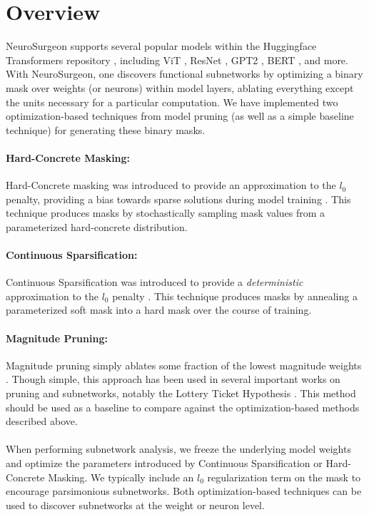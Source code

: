 \documentclass[11pt]{article}
\begin{document}
\section{Overview}
  NeuroSurgeon supports several popular models within the Huggingface Transformers repository \cite{wolf2019huggingface}, including ViT \cite{dosovitskiy2020image}, ResNet \cite{he2016deep}, GPT2 \cite{radford2019language}, BERT \cite{devlin2018bert}, and more. 
  With NeuroSurgeon, one discovers functional subnetworks by optimizing a binary mask over weights (or neurons) within model layers, ablating everything except the units necessary for a particular computation.
We have implemented two optimization-based techniques from model pruning (as well as a simple baseline technique) for generating these binary masks.

\paragraph{Hard-Concrete Masking:}
Hard-Concrete masking was introduced to provide an approximation to the $l_0$ penalty, providing a bias towards sparse solutions during model training \cite{louizos2017learning}. This technique produces masks by stochastically sampling mask values from a parameterized hard-concrete distribution. 
\paragraph{Continuous Sparsification:}
Continuous Sparsification was introduced to provide a \textit{deterministic} approximation to the $l_0$ penalty \cite{savarese2020winning}. This technique produces masks by annealing a parameterized soft mask into a hard mask over the course of training. 

\paragraph{Magnitude Pruning:}
Magnitude pruning simply ablates some fraction of the lowest magnitude weights \cite{han2015learning}. Though simple, this approach has been used in several important works on pruning and subnetworks, notably the Lottery Ticket Hypothesis \cite{frankle2018lottery}. This method should be used as a baseline to compare against the optimization-based methods described above.

\paragraph{}When performing subnetwork analysis, we freeze the underlying model weights and optimize the parameters introduced by Continuous Sparsification or Hard-Concrete Masking. We typically include an $l_0$ regularization term on the mask to encourage parsimonious subnetworks. Both optimization-based techniques can be used to discover subnetworks at the weight or neuron level.
\end{document}
